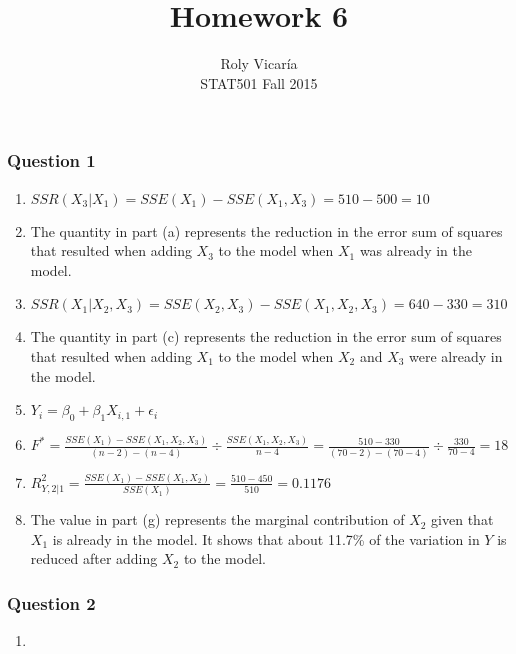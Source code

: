\documentclass{article}
\title{Homework 6}
\author{Roly Vicar\'ia \\ STAT501 Fall 2015}
\begin{document}
    
    
    \maketitle
    
    

    
    \subsubsection{Question 1}\label{question-1}

\begin{enumerate}
\def\labelenumi{\alph{enumi})}
\item
  \(SSR(X_3 | X_1) = SSE(X_1) - SSE(X_1, X_3) = 510 - 500 = 10\)
\item
  The quantity in part (a) represents the reduction in the error sum of
  squares that resulted when adding \(X_3\) to the model when \(X_1\)
  was already in the model.
\item
  \(SSR(X_1 | X_2, X_3) = SSE(X_2, X_3) - SSE(X_1, X_2, X_3) = 640 - 330 = 310\)
\item
  The quantity in part (c) represents the reduction in the error sum of
  squares that resulted when adding \(X_1\) to the model when \(X_2\)
  and \(X_3\) were already in the model.
\item
  \(Y_i = \beta_0 + \beta_1X_{i,1} + \epsilon_i\)
\item
  \(F^* = \frac{SSE(X_1) - SSE(X_1, X_2, X_3)}{(n - 2) - (n - 4)} \div \frac{SSE(X_1, X_2, X_3)}{n - 4} = \frac{510 - 330}{(70 - 2) - (70 - 4)} \div \frac{330}{70 - 4} = 18\)
\item
  \(R^2_{Y,2|1} = \frac{SSE(X_1) - SSE(X_1, X_2)}{SSE(X_1)} = \frac{510 - 450}{510} = 0.1176\)
\item
  The value in part (g) represents the marginal contribution of \(X_2\)
  given that \(X_1\) is already in the model. It shows that about 11.7\%
  of the variation in \(Y\) is reduced after adding \(X_2\) to the
  model.
\end{enumerate}

    \subsubsection{Question 2}\label{question-2}

\begin{enumerate}
\def\labelenumi{\alph{enumi})}
\item
\end{enumerate}
\end{document}
